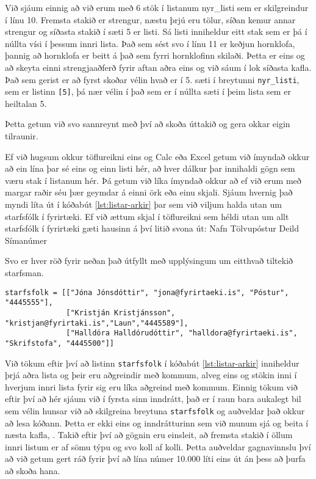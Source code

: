 Við sjáum einnig að við erum með 6 stök í listanum nyr\_listi sem er skilgreindur í línu 10.
Fremsta stakið er strengur, næstu þrjú eru tölur, síðan kemur annar strengur og síðasta stakið í sæti 5 er listi.
Sá listi inniheldur eitt stak sem er þá í núllta vísi í þessum innri lista.
Það sem sést svo í línu 11 er keðjun hornklofa, þannig að hornklofa er beitt á það sem fyrri hornklofinn skilaði.
Þetta er eins og að skeyta einni strengjaaðferð fyrir aftan aðra eins og við sáum í lok síðasta kafla.
Það sem gerist er að fyrst skoðar vélin hvað er í 5. sæti í breytunni \texttt{nyr\_listi}, sem er listinn \texttt{[5]}, þá nær vélin í það sem er í núllta sæti í þeim lista sem er heiltalan 5.

Þetta getum við svo sannreynt með því að skoða úttakið og gera okkar eigin tilraunir.


Ef við hugsum okkur töflureikni eins og Calc eða Excel getum við ímyndað okkur að ein lína þar sé eins og einn listi hér, að hver dálkur þar innihaldi gögn sem væru stak í listanum hér.
Þá getum við líka ímyndað okkur að ef við erum með margar raðir séu þær geymdar á einni örk eða einu skjali.
Sjáum hvernig það myndi líta út í kóðabút \ref{lst:listar-arkir} þar sem við viljum halda utan um starfsfólk í fyrirtæki.
Ef við ættum skjal í töflureikni sem héldi utan um allt starfsfólk í fyrirtæki gæti hausinn á því litið svona út: Nafn \hspace{0.1cm} Tölvupóstur \hspace{0.1cm}Deild\hspace{0.1cm} Símanúmer 

Svo er hver röð fyrir neðan það útfyllt með upplýsingum um eitthvað tiltekið starfsman.

\begin{lstlisting}[caption=Listar af listum, label=lst:listar-arkir]
starfsfolk = [["Jóna Jónsdóttir", "jona@fyrirtaeki.is", "Póstur", "4445555"],
			  ["Kristján Kristjánsson", "kristjan@fyrirtaki.is","Laun","4445589"],
			  ["Halldóra Halldórudóttir", "halldora@fyrirtaeki.is", "Skrifstofa", "4445500"]]

\end{lstlisting}

Við tökum eftir því að listinn \texttt{starfsfolk} í kóðabút \ref{lst:listar-arkir} inniheldur þrjá aðra lista og þeir eru aðgreindir með kommum, alveg eins og stökin inni í hverjum innri lista fyrir sig eru líka aðgreind með kommum.
Einnig tökum við eftir því að hér sjáum við í fyrsta sinn inndrátt, það er í raun bara aukalegt bil sem vélin hunsar við að skilgreina breytuna \texttt{starfsfolk} og auðveldar það okkur að lesa kóðann.
Þetta er ekki eins og inndrátturinn sem við munum sjá og beita í næsta kafla, .
Takið eftir því að gögnin eru einsleit, að fremsta stakið í öllum innri listum er af sömu týpu og svo koll af kolli.
Þetta auðveldar gagnavinnslu því að við getum gert ráð fyrir því að lína númer 10.000 líti eins út án þess að þurfa að skoða hana.
 
